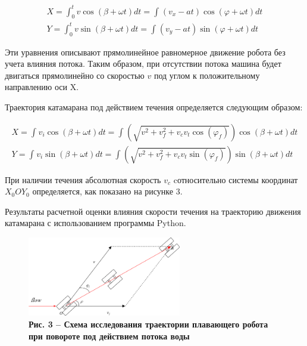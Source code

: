 \begin{equation}
  \begin{aligned}
    X = \int_{0}^{t}v\cos(\beta + \omega t)dt = \int_{}^{}\left( v_{x} - at \right)\cos(\varphi + \omega t)dt \\
    Y = \int_{0}^{t}v\sin(\beta + \omega t)dt = \int_{}^{}\left( v_{y} - at \right)\sin(\varphi + \omega t)dt
  \end{aligned}
\end{equation}

\begin{multicols}{2}

Эти уравнения описывают прямолинейное равномерное движение робота без
учета влияния потока. Таким образом, при отсутствии потока машина будет
двигаться прямолинейно со скоростью \(v\) под углом к положительному
направлению оси X.

Траектория катамарана под действием течения определяется следующим
образом:
\end{multicols}

\begin{equation}
  \begin{aligned}
    X = \int_{}^{}v_{i}\cos(\beta + \omega t)dt = \int_{}^{}\left( \sqrt{v^{2} + v_{f}^{2} + v_{c}v_{t}\cos\left( \varphi_{f} \right)} \right)\cos(\beta + \omega t)dt \\
    Y = \int_{}^{}v_{i}\sin(\beta + \omega t)dt = \int_{}^{}\left( \sqrt{v^{2} + v_{f}^{2} + v_{c}v_{t}\sin\left( \varphi_{f} \right)} \right)\sin(\beta + \omega t)dt
  \end{aligned}
\end{equation}

\begin{multicols}{2}


При наличии течения абсолютная скорость \(v_{c}\) cотносительно системы
координат  \(X_{0}OY_{0}\) определяется, как показано на рисунке 3.

Результаты расчетной оценки влияния скорости течения на траекторию
движения катамарана с использованием программы Python.
\end{multicols}

\begin{figure}[H]
	\centering
	\includegraphics[width=0.6\textwidth]{assets/210}
	\caption*{\bfseries Рис. 3 -- Схема исследования траектории плавающего робота при повороте под действием потока воды}
\end{figure}



